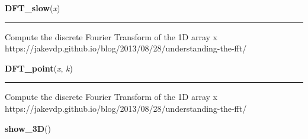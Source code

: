     \vspace{0.5ex}

\hspace{.8\funcindent}\begin{boxedminipage}{\funcwidth}

    \raggedright \textbf{DFT\_slow}(\textit{x})

    \vspace{-1.5ex}

    \rule{\textwidth}{0.5\fboxrule}
\setlength{\parskip}{2ex}
    Compute the discrete Fourier Transform of the 1D array x 
    https://jakevdp.github.io/blog/2013/08/28/understanding-the-fft/

\setlength{\parskip}{1ex}
    \end{boxedminipage}

    \label{CsTransform:pynufft:DFT_point}

    \vspace{0.5ex}

\hspace{.8\funcindent}\begin{boxedminipage}{\funcwidth}

    \raggedright \textbf{DFT\_point}(\textit{x}, \textit{k})

    \vspace{-1.5ex}

    \rule{\textwidth}{0.5\fboxrule}
\setlength{\parskip}{2ex}
    Compute the discrete Fourier Transform of the 1D array x 
    https://jakevdp.github.io/blog/2013/08/28/understanding-the-fft/

\setlength{\parskip}{1ex}
    \end{boxedminipage}

    \label{CsTransform:pynufft:show_3D}

    \vspace{0.5ex}

\hspace{.8\funcindent}\begin{boxedminipage}{\funcwidth}

    \raggedright \textbf{show\_3D}()

\setlength{\parskip}{2ex}
\setlength{\parskip}{1ex}
    \end{boxedminipage}

